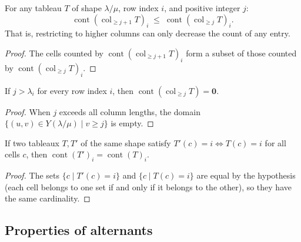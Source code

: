 \begin{lemma}
\label{lem.sf.content-col-geq-mono}
\leanhelper
\leanok
For any tableau $T$ of shape $\lambda/\mu$, row index $i$, and positive
integer $j$:
\[
  \operatorname{cont}(\operatorname{col}_{\geq j+1} T)_i
  \;\leq\;
  \operatorname{cont}(\operatorname{col}_{\geq j} T)_i.
\]
That is, restricting to higher columns can only decrease the count
of any entry.
\end{lemma}

\begin{proof}
\leanok
The cells counted by $\operatorname{cont}(\operatorname{col}_{\geq j+1} T)_i$
form a subset of those counted by $\operatorname{cont}(\operatorname{col}_{\geq j} T)_i$.
\end{proof}

\begin{lemma}
\label{lem.sf.content-col-geq-zero}
\leanhelper
\leanok
If $j > \lambda_i$ for every row index $i$, then
$\operatorname{cont}(\operatorname{col}_{\geq j} T) = \mathbf{0}$.
\end{lemma}

\begin{proof}
\leanok
When $j$ exceeds all column lengths, the domain
$\{(u,v) \in Y(\lambda/\mu) \mid v \geq j\}$ is empty.
\end{proof}

\begin{lemma}
\label{lem.sf.content-eq-of-iff}
\leanhelper
\leanok
If two tableaux $T, T'$ of the same shape satisfy
$T'(c) = i \iff T(c) = i$ for all cells $c$, then
$\operatorname{cont}(T')_i = \operatorname{cont}(T)_i$.
\end{lemma}

\begin{proof}
\leanok
The sets $\{c \mid T'(c) = i\}$ and $\{c \mid T(c) = i\}$ are equal
by the hypothesis (each cell belongs to one set if and only if it belongs to the other),
so they have the same cardinality.
\end{proof}

\subsection{Properties of alternants}


